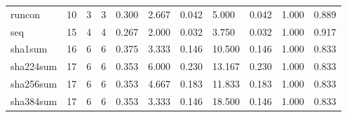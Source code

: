 \begin{longtable}{lp{1.8cm}p{1.8cm}p{1.8cm}p{1.8cm}p{1.8cm}p{1.8cm}p{1.8cm}p{1.8cm}p{1.8cm}p{1.8cm}}
runcon    &                           10 &                  3 &                                 3 &                                      0.300 &                                  2.667 &                                        0.042 &                             5.000 &                                   0.042 &                              1.000 &                                              0.889 \\
seq       &                           15 &                  4 &                                 4 &                                      0.267 &                                  2.000 &                                        0.032 &                             3.750 &                                   0.032 &                              1.000 &                                              0.917 \\
sha1sum   &                           16 &                  6 &                                 6 &                                      0.375 &                                  3.333 &                                        0.146 &                            10.500 &                                   0.146 &                              1.000 &                                              0.833 \\
sha224sum &                           17 &                  6 &                                 6 &                                      0.353 &                                  6.000 &                                        0.230 &                            13.167 &                                   0.230 &                              1.000 &                                              0.833 \\
sha256sum &                           17 &                  6 &                                 6 &                                      0.353 &                                  4.667 &                                        0.183 &                            11.833 &                                   0.183 &                              1.000 &                                              0.833 \\
sha384sum &                           17 &                  6 &                                 6 &                                      0.353 &                                  3.333 &                                        0.146 &                            18.500 &                                   0.146 &                              1.000 &                                              0.833 \\

\end{longtable}
